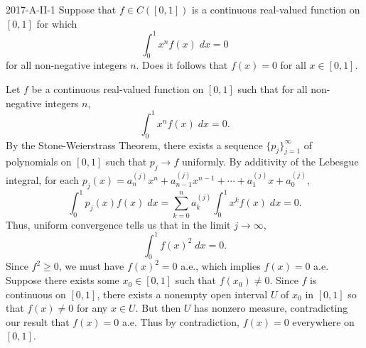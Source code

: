 \documentclass{article}
\begin{document}
	\begin{prb}{2017-A-II-1}
		Suppose that $f \in C([0,1])$ is a continuous real-valued function on $[0,1]$ for which 
		\begin{equation*}
			\int_0^1x^nf(x)\;dx = 0
		\end{equation*}
		for all non-negative integers $n$. Does it follows that $f(x) = 0$ for all $x \in [0,1]$. 
	\end{prb}
	Let $f$ be a continuous real-valued function on $[0,1]$ such that for all non-negative integers $n$, 
	\begin{equation*}
		\int_0^1x^nf(x)\;dx = 0. 
	\end{equation*}
	By the Stone-Weierstrass Theorem, there exists a sequence $\{p_j\}_{j = 1}^{\infty}$ of polynomials on $[0,1]$ such that $p_j \to f$ uniformly. By additivity of the Lebesgue integral, for each $p_j(x) = a^{(j)}_nx^n + a^{(j)}_{n-1}x^{n-1} + \dotsm + a^{(j)}_{1}x + a_{0}^{(j)}$, 
	\begin{equation*}
		\int_{0}^{1}p_j(x)f(x)\;dx = \sum_{k  = 0}^{n}a_{k}^{(j)}\int_{0}^1x^{k}f(x)\;dx = 0. 
	\end{equation*}
	Thus, uniform convergence tells us that in the limit $j \to \infty$, 
	\begin{equation*}
		\int_{0}^{1}f(x)^2\;dx = 0. 
	\end{equation*}
	Since $f^2 \geq 0$, we must have $f(x)^2 = 0$ a.e., which implies $f(x) =0$ a.e. Suppose there exists some $x_0 \in [0,1]$ such that $f(x_0) \neq 0$. Since $f$ is continuous on $[0,1]$, there exists a nonempty open interval $U$ of $x_0$ in $[0,1]$ so that $f(x) \neq 0$ for any $x \in U$. But then $U$ has nonzero measure, contradicting our result that $f(x) =0 $ a.e. Thus by contradiction, $f(x) = 0$ everywhere on $[0,1]$. 
	
\end{document}
